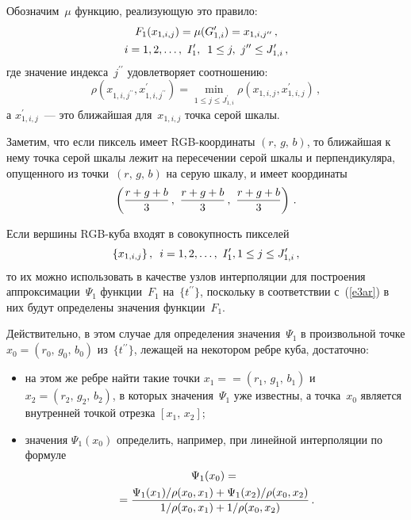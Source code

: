 \begin{multicols}{2}
  Обозначим~$\mu$ функцию, реализующую это правило:
  \begin{multline}
F_1(x_{1,i,j}) = \mu (G^\prime_{1,i}) = x_{1,i,j^{\prime\prime}}\,,\\
i = 1, 2, \ldots,\ I^\prime_1,\enskip 1 \leq j,\ j^{\prime\prime}\leq J^\prime_{1,i}\,,       
\label{e3ar}
\end{multline}
где значение индекса~$j^{\prime\prime}$ удовлетворяет соотношению: 
$$
\rho(x_{1,i,j^{\prime\prime}}, x^\prime_{1,i,j^{\prime\prime}})=
\underset{1\leq j\leq J^\prime_{1,i}}{\min} \rho \left( x_{1,i,j}, x^\prime_{1,i,j}\right)\,,
$$
а $x^\prime_{1,i,j}$~--- это ближайшая для~$x_{1,i,j}$ точка серой шкалы.
  
  Заметим, что если пиксель имеет RGB-ко\-ор\-ди\-на\-ты $(r,\,g,\,b)$, то 
ближайшая к нему точка серой шкалы лежит на пересечении серой шкалы и 
перпендикуляра, опущенного из точки~$(r,\,g,\,b)$ на серую шкалу, и имеет 
координаты
  $$
  \left( \displaystyle\frac{\displaystyle  r+g+b \mathstrut}{\displaystyle 3\mathstrut}\,,\ \displaystyle\frac{\displaystyle r+g+b\mathstrut}{\displaystyle 3\mathstrut}\,,\ \displaystyle\frac{\displaystyle r+g+b\mathstrut}{\displaystyle 3\mathstrut}\right )\,.
  $$
  
  Если вершины RGB-ку\-ба входят в совокупность пикселей 
  $$
  \{x_{1,i,j}\}\,,\enskip i = 1, 2, \ldots ,\ I^\prime_1, 1 \leq j \leq J^\prime_{1,i}\,, 
  $$
то их можно использовать в качестве узлов интерполяции для построения 
аппроксимации~$\Psi_1$ функции~$F_1$ на~$\{t^{\prime\prime}\}$, поскольку 
в соответствии с~(\ref{e3ar}) в них будут определены значения 
функции~$F_1$.
  
  Действительно, в этом случае для определения значения~$\Psi_1$ в 
произвольной точке $x_0 = (r_0,\,g_0,\,b_0)$ из~$\{t^{\prime\prime}\}$, лежащей 
на некотором ребре куба, достаточно:
  \begin{itemize}
  \item на этом же ребре найти такие точки $x_1 =$\linebreak $= (r_1,\,g_1,\,b_1)$ и $x_2 = 
(r_2,\,g_2,\,b_2)$, в которых значения~$\Psi_1$ уже известны, а точка~$x_0$ 
является внутренней точкой отрезка $[x_1,\,x_2]$;
  \item значения $\Psi_1(x_0)$ определить, например, при линейной 
интерполяции по формуле
  \begin{multline*}
  \Psi_1(x_0) ={}\\
  {}=\displaystyle\frac{\displaystyle \Psi_1(x_1)/\rho(x_0, x_1)+{\Psi_1(x_2)}/\rho(x_0, x_2)\mathstrut}{\displaystyle 
{1}/{\rho(x_0, x_1)}+{1}/\rho(x_0, x_2)\mathstrut}\,.
\end{multline*}
  \end{itemize}
  

\end{multicols}
